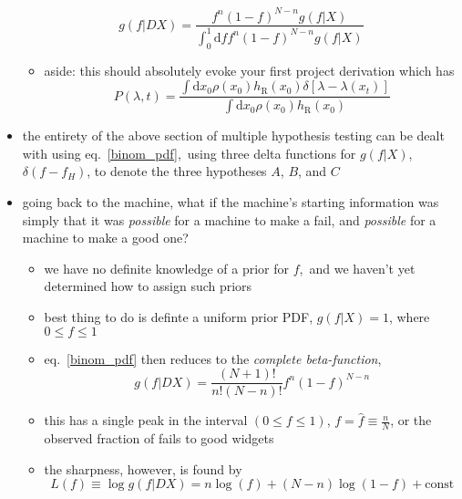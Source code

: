 \documentclass[../jaynes_prob_theory_notes.tex]{subfiles}
\begin{document}
\begin{itemize}
            \begin{equation}
                \label{binom_pdf}
                g(f|DX) = \frac{f^{n}{(1-f)}^{N-n}g(f|X)}{\int^1_{0}\mathrm{d}f{f^n(1-f)}^{N-n}g(f|X)}
            \end{equation}
            \begin{itemize}
                \item aside: this should absolutely evoke your first project derivation which has 
                    \begin{equation*}
                        P(\lambda, t) = \frac{\int \mathrm{d}x_0 \rho(x_0)h_{\mathrm{R}}(x_0) \delta[\lambda - \lambda(x_t)]}{\int \mathrm{d}x_0 \rho(x_0)h_{\mathrm{R}}(x_0)}
                    \end{equation*}
            \end{itemize}
        \item the entirety of the above section of multiple hypothesis testing can be dealt with using eq.~\ref{binom_pdf},\ using three delta functions for $g(f|X)$, $\delta(f-f_H)$, to denote the three hypotheses $A$, $B$, and $C$
        \item going back to the machine, what if the machine's starting information was simply that it was \textit{possible} for a machine to make a fail, and \textit{possible} for a machine to make a good one?
            \begin{itemize}
                \item we have no definite knowledge of a prior for $f$,\ and we haven't yet determined how to assign such priors
                \item best thing to do is definte a uniform prior PDF, $g(f|X) = 1$, where $0 \leq f \leq 1$
                \item eq.~\ref{binom_pdf} then reduces to the \textit{complete beta-function},
                    \begin{equation*}
                        g(f|DX) = \frac{(N+1)!}{n!(N-n)!} f^{n}{(1-f)}^{N-n}
                    \end{equation*}
                \item this has a single peak in the interval $(0 \leq f \leq 1)$, $f=\hat{f} \equiv \frac{n}{N}$, or the observed fraction of fails to good widgets
                \item the sharpness, however, is found by
                    \begin{equation*}
                        L(f) \equiv \log g(f|DX) = n\log(f) + (N-n)\log(1-f) + \mathrm{const}

\end{equation*}
\end{itemize}
\end{itemize}
\end{document}

